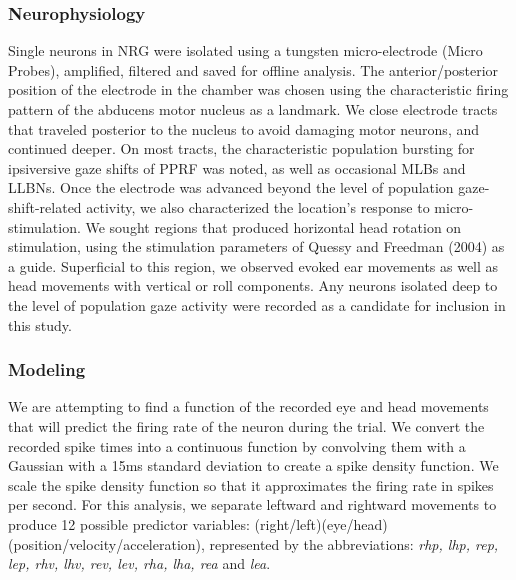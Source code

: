 \documentclass[]{article}
\begin{document}
\subsubsection{Neurophysiology}\label{neurophysiology}

Single neurons in NRG were isolated using a tungsten micro-electrode
(Micro Probes), amplified, filtered and saved for offline analysis. The
anterior/posterior position of the electrode in the chamber was chosen
using the characteristic firing pattern of the abducens motor nucleus as
a landmark. We close electrode tracts that traveled posterior to the
nucleus to avoid damaging motor neurons, and continued deeper. On most
tracts, the characteristic population bursting for ipsiversive gaze
shifts of PPRF was noted, as well as occasional MLBs and LLBNs. Once the
electrode was advanced beyond the level of population gaze-shift-related
activity, we also characterized the location's response to
micro-stimulation. We sought regions that produced horizontal head
rotation on stimulation, using the stimulation parameters of Quessy and
Freedman (2004) as a guide. Superficial to this region, we observed
evoked ear movements as well as head movements with vertical or roll
components. Any neurons isolated deep to the level of population gaze
activity were recorded as a candidate for inclusion in this study.

\subsubsection{Modeling}\label{modeling}

We are attempting to find a function of the recorded eye and head
movements that will predict the firing rate of the neuron during the
trial. We convert the recorded spike times into a continuous function by
convolving them with a Gaussian with a 15ms standard deviation to create
a spike density function. We scale the spike density function so that it
approximates the firing rate in spikes per second. For this analysis, we
separate leftward and rightward movements to produce 12 possible
predictor variables:
(right/left)(eye/head)(position/velocity/acceleration), represented by
the abbreviations: \emph{rhp, lhp, rep, lep, rhv, lhv, rev, lev, rha,
lha, rea} and \emph{lea}.
\end{document}
